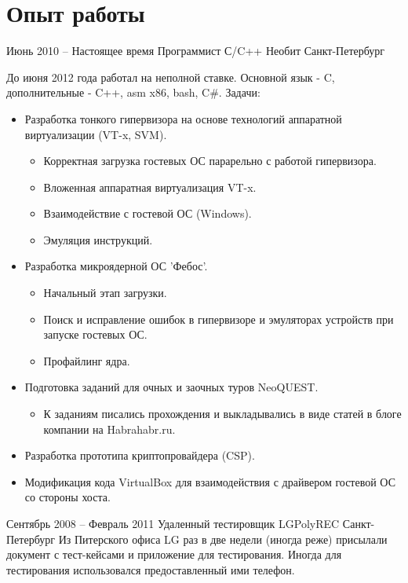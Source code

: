 \documentclass[11pt,a4paper,russian]{moderncv}
\begin{document}
\section{Опыт работы}
    \cventry
        {Июнь 2010 -- Настоящее время}
        {Программист С/C++}
        {Необит}
        {Санкт-Петербург}
        {}
        {До июня 2012 года работал на неполной ставке.
        \newline Основной язык - C, дополнительные - C++, asm x86, bash, C\#.\newline{}%
            Задачи:%
            \begin{itemize}%
            \item Разработка тонкого гипервизора на основе технологий
                аппаратной виртуализации (VT-x, SVM).
                \begin{itemize}
                \item Корректная загрузка гостевых ОС парарельно с работой
                    гипервизора.
                \item Вложенная аппаратная виртуализация VT-x.
                \item Взаимодействие с гостевой ОС (Windows).
                \item Эмуляция инструкций.
                \end{itemize}
            \item Разработка микроядерной ОС 'Фебос'.
                \begin{itemize}%
                \item Начальный этап загрузки.
                \item Поиск и исправление ошибок в гипервизоре и эмуляторах
                    устройств при запуске гостевых ОС.
                \item Профайлинг ядра.
                \end{itemize}
            \item Подготовка заданий для очных и заочных туров NeoQUEST.
                \begin{itemize}%
                \item К заданиям писались прохождения и выкладывались в виде
                    статей в блоге компании на Habrahabr.ru.
                \end{itemize}
            \item Разработка прототипа криптопровайдера (CSP).
            \item Модификация кода VirtualBox для взаимодействия с драйвером
                гостевой ОС со стороны хоста.
            \end{itemize}
        }
    \cventry
        {Сентябрь 2008 -- Февраль 2011}
        {Удаленный тестировщик}
        {LGPolyREC}
        {Санкт-Петербург}
        {}
        {Из Питерского офиса LG раз в две недели (иногда реже) присылали
        документ с тест-кейсами и приложение для тестирования. Иногда для
        тестирования использовался предоставленный ими телефон.}
\end{document}
